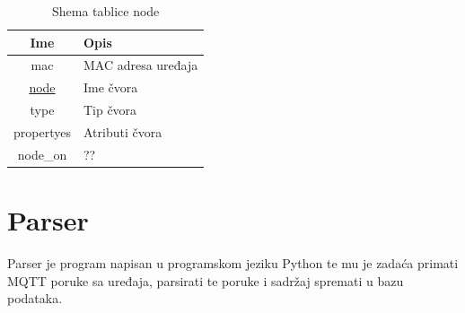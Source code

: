 \documentclass[times, utf8, zavrsni]{fer}
\begin{document}

\begin{table}[H]
    \centering
    \begin{tabular}{ |c|l| }
        \hline
        Ime & Opis\\
        \hline
        mac & MAC adresa uređaja\\
        \hline
        \underline{node} & Ime čvora\\
        \hline
        type & Tip čvora\\
        \hline
        propertyes & Atributi čvora\\
        \hline
        node\_on & ??\\
        \hline
    \end{tabular}
    \caption{Shema tablice node}\label{tab:node_table}
\end{table}

\section{Parser}
Parser je program napisan u programskom jeziku Python te mu je zadaća primati MQTT poruke sa uređaja, parsirati te poruke i sadržaj spremati u bazu podataka.
\end{document}
